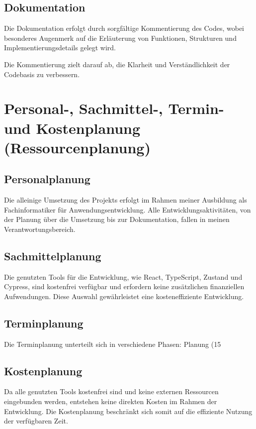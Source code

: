 \documentclass{article}
\begin{document}
\subsection{Dokumentation}
Die Dokumentation erfolgt durch sorgfältige Kommentierung des Codes, wobei besonderes Augenmerk auf die Erläuterung von Funktionen, Strukturen und Implementierungsdetails gelegt wird.

Die Kommentierung zielt darauf ab, die Klarheit und Verständlichkeit der Codebasis zu verbessern.

\section{Personal-, Sachmittel-, Termin- und Kostenplanung (Ressourcenplanung)}

\subsection{Personalplanung}
Die alleinige Umsetzung des Projekts erfolgt im Rahmen meiner Ausbildung als Fachinformatiker für Anwendungsentwicklung. Alle Entwicklungsaktivitäten, von der Planung über die Umsetzung bis zur Dokumentation, fallen in meinen Verantwortungsbereich.

\subsection{Sachmittelplanung}
Die genutzten Tools für die Entwicklung, wie React, TypeScript, Zustand und Cypress, sind kostenfrei verfügbar und erfordern keine zusätzlichen finanziellen Aufwendungen. Diese Auswahl gewährleistet eine kosteneffiziente Entwicklung.

\subsection{Terminplanung}
Die Terminplanung unterteilt sich in verschiedene Phasen: Planung (15%

\subsection{Kostenplanung}
Da alle genutzten Tools kostenfrei sind und keine externen Ressourcen eingebunden werden, entstehen keine direkten Kosten im Rahmen der Entwicklung. Die Kostenplanung beschränkt sich somit auf die effiziente Nutzung der verfügbaren Zeit.
\end{document}
